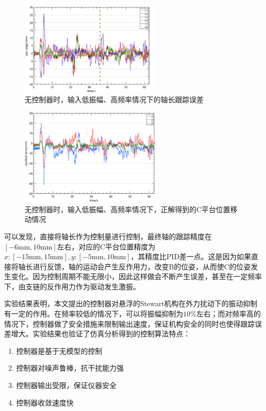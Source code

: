 \begin{figure}[H]
    \centering
    \includegraphics[width=0.6\textwidth]{imgs/Experiment/N-AH-FL_1_axis_diff_length.png}
    \caption{无控制器时，输入低振幅、高频率情况下的轴长跟踪误差}
    \label{fig:N-AH-FL_1_axis_diff_length}
\end{figure}

\begin{figure}[H]
    \centering
    \includegraphics[width=0.6\textwidth]{imgs/Experiment/N-AH-FL_1_c_movement.png}
    \caption{无控制器时，输入低振幅、高频率情况下，正解得到的C平台位置移动情况}
    \label{fig:N-AH-FL_1_c_movement}
\end{figure}

可以发现，直接将轴长作为控制量进行控制，最终轴的跟踪精度在$\left[ -6\mathrm{mm},10\mathrm{mm} \right] $左右，对应的C平台位置精度为$x:\left[ -15\mathrm{mm},15\mathrm{mm} \right] ,y:\left[ -5\mathrm{mm},10\mathrm{mm} \right] $，其精度比PID差一点。这是因为如果直接将轴长进行反馈，轴的运动会产生反作用力，改变B的位姿，从而使C的位姿发生变化。因为控制周期不能无限小，因此这样做会不断产生误差，甚至在一定频率下，由支链的反作用力作为驱动发生激振。


实验结果表明，本文提出的控制器对悬浮的Stewart机构在外力扰动下的振动抑制有一定的作用。在频率较低的情况下，可以将振幅抑制为$10\%$左右；而对频率高的情况下，控制器做了安全措施来限制输出速度，保证机构安全的同时也使得跟踪误差增大。实验结果也验证了仿真分析得到的控制算法特点：

\begin{enumerate}
    \item 控制器是基于无模型的控制
    \item 控制器对噪声鲁棒，抗干扰能力强
    \item 控制器输出受限，保证仪器安全
    \item 控制器收敛速度快
\end{enumerate}
\FloatBarrier
